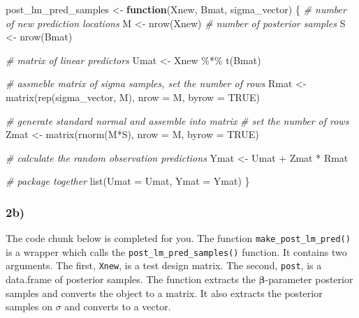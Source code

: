 \documentclass[
]{article}
\newenvironment{Shaded}{\begin{snugshade}}{\end{snugshade}}
\newcommand{\AttributeTok}[1]{\textcolor[rgb]{0.77,0.63,0.00}{#1}}
\newcommand{\CommentTok}[1]{\textcolor[rgb]{0.56,0.35,0.01}{\textit{#1}}}
\newcommand{\ConstantTok}[1]{\textcolor[rgb]{0.00,0.00,0.00}{#1}}
\newcommand{\ControlFlowTok}[1]{\textcolor[rgb]{0.13,0.29,0.53}{\textbf{#1}}}
\newcommand{\FunctionTok}[1]{\textcolor[rgb]{0.00,0.00,0.00}{#1}}
\newcommand{\NormalTok}[1]{#1}
\newcommand{\OtherTok}[1]{\textcolor[rgb]{0.56,0.35,0.01}{#1}}
\newcommand{\SpecialCharTok}[1]{\textcolor[rgb]{0.00,0.00,0.00}{#1}}
\begin{document}
\begin{Shaded}
\begin{Highlighting}[]
\NormalTok{post\_lm\_pred\_samples }\OtherTok{\textless{}{-}} \ControlFlowTok{function}\NormalTok{(Xnew, Bmat, sigma\_vector)}
\NormalTok{\{}
  \CommentTok{\# number of new prediction locations}
\NormalTok{  M }\OtherTok{\textless{}{-}} \FunctionTok{nrow}\NormalTok{(Xnew)}
  \CommentTok{\# number of posterior samples}
\NormalTok{  S }\OtherTok{\textless{}{-}} \FunctionTok{nrow}\NormalTok{(Bmat)}
  
  \CommentTok{\# matrix of linear predictors}
\NormalTok{  Umat }\OtherTok{\textless{}{-}}\NormalTok{ Xnew }\SpecialCharTok{\%*\%} \FunctionTok{t}\NormalTok{(Bmat)}
  
  \CommentTok{\# assmeble matrix of sigma samples, set the number of rows}
\NormalTok{  Rmat }\OtherTok{\textless{}{-}} \FunctionTok{matrix}\NormalTok{(}\FunctionTok{rep}\NormalTok{(sigma\_vector, M), }\AttributeTok{nrow =}\NormalTok{ M, }\AttributeTok{byrow =} \ConstantTok{TRUE}\NormalTok{)}
  
  \CommentTok{\# generate standard normal and assemble into matrix}
  \CommentTok{\# set the number of rows}
\NormalTok{  Zmat }\OtherTok{\textless{}{-}} \FunctionTok{matrix}\NormalTok{(}\FunctionTok{rnorm}\NormalTok{(M}\SpecialCharTok{*}\NormalTok{S), }\AttributeTok{nrow =}\NormalTok{ M, }\AttributeTok{byrow =} \ConstantTok{TRUE}\NormalTok{)}
  
  \CommentTok{\# calculate the random observation predictions}
\NormalTok{  Ymat }\OtherTok{\textless{}{-}}\NormalTok{ Umat }\SpecialCharTok{+}\NormalTok{ Zmat }\SpecialCharTok{*}\NormalTok{ Rmat}
  
  \CommentTok{\# package together}
  \FunctionTok{list}\NormalTok{(}\AttributeTok{Umat =}\NormalTok{ Umat, }\AttributeTok{Ymat =}\NormalTok{ Ymat)}
\NormalTok{\}}
\end{Highlighting}
\end{Shaded}

\hypertarget{b-1}{%
\subsubsection{2b)}\label{b-1}}

The code chunk below is completed for you. The function
\texttt{make\_post\_lm\_pred()} is a wrapper which calls the
\texttt{post\_lm\_pred\_samples()} function. It contains two arguments.
The first, \texttt{Xnew}, is a test design matrix. The second,
\texttt{post}, is a data.frame of posterior samples. The function
extracts the \(\boldsymbol{\beta}\)-parameter posterior samples and
converts the object to a matrix. It also extracts the posterior samples
on \(\sigma\) and converts to a vector.
\end{document}
